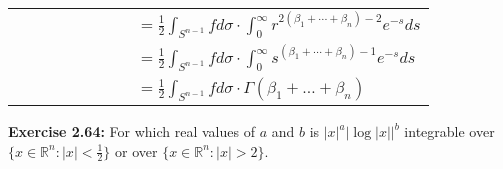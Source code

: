 \documentclass{book}
\newenvironment{myIndent}{%
   \begin{adjustwidth}{2.5em}{0em}%
}{%
   \end{adjustwidth}%
}
\newcommand{\blab}[1]{\textbf{#1}}
\newcommand{\retTwo}{\hfill\bigbreak}
\begin{document}
\begin{myIndent}
{\begin{tabular}{l}
		$\phantom{\Gamma(\beta_1)\cdots\Gamma(\beta_n)} = \frac{1}{2}\int_{S^{n-1}} f d\sigma \cdot \int_0^\infty r^{2(\beta_1 + \cdots + \beta_n) - 2} e^{-s}ds$\\ [6pt]

		$\phantom{\Gamma(\beta_1)\cdots\Gamma(\beta_n)} = \frac{1}{2}\int_{S^{n-1}} f d\sigma \cdot \int_0^\infty s^{(\beta_1 + \cdots + \beta_n) - 1} e^{-s}ds$\\ [6pt]
		
		$\phantom{\Gamma(\beta_1)\cdots\Gamma(\beta_n)} = \frac{1}{2}\int_{S^{n-1}} f d\sigma \cdot \Gamma(\beta_1 + \ldots + \beta_n)$\\ [6pt]
	\end{tabular}\retTwo\par}
\end{myIndent}

\blab{Exercise 2.64:} For which real values of $a$ and $b$ is $\left|x\right|^a \left|\log\left|x\right|\right|^b$ integrable over\\ $\{x \in \mathbb{R}^n : |x| < \frac{1}{2}\}$ or over $\{x \in \mathbb{R}^n : |x| > 2\}$.
\end{document}
